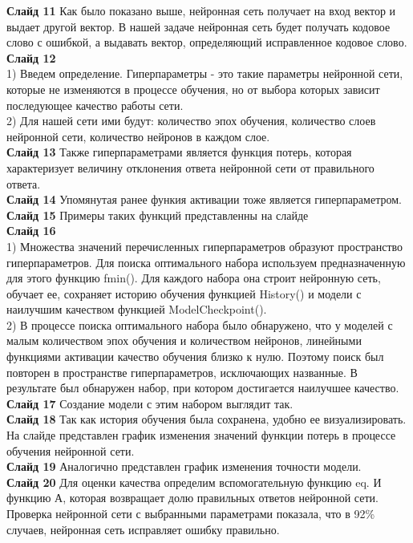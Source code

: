 \documentclass[a4paper]{article}
\begin{document}
\newpage
\textbf{Слайд 11}
Как было показано выше, нейронная сеть получает на вход вектор и выдает другой вектор. В нашей задаче нейронная сеть будет получать кодовое слово с ошибкой, а выдавать вектор, определяющий исправленное кодовое слово.\\

\textbf{Слайд 12}\\
1) Введем определение. Гиперпараметры - это такие параметры нейронной сети, которые не изменяются в процессе обучения, но от выбора которых зависит последующее качество работы сети. \\
2) Для нашей сети ими будут: количество эпох обучения, количество слоев нейронной сети, количество нейронов в каждом слое.\\

\textbf{Слайд 13}
Также гиперпараметрами является функция потерь, которая характеризует величину отклонения ответа нейронной сети от правильного ответа.\\

\textbf{Слайд 14}
Упомянутая ранее функия активации тоже является гиперпараметром.\\

\textbf{Слайд 15}
Примеры таких функций представленны на слайде\\

\textbf{Слайд 16}\\
1) Множества значений перечисленных гиперпараметров образуют пространство гиперпараметров. Для поиска оптимального набора используем предназначенную для этого функцию fmin(). Для каждого набора она строит нейронную сеть, обучает ее, сохраняет историю обучения функцией History() и модели с наилучшим качеством функцией ModelCheckpoint().\\
2) В процессе поиска оптимального набора было обнаружено, что у моделей с малым количеством эпох обучения и количеством нейронов, линейными функциями активации качество обучения близко к нулю. Поэтому поиск был повторен в пространстве гиперпараметров, исключающих названные. В результате был обнаружен набор, при котором достигается наилучшее качество.\\

\textbf{Слайд 17}
Создание модели с этим набором выглядит так.\\

\textbf{Слайд 18}
Так как история обучения была сохранена, удобно ее визуализировать. На слайде представлен график изменения значений функции потерь в процессе обучения нейронной сети.\\

\textbf{Слайд 19}
Аналогично представлен график изменения точности модели.\\

\textbf{Слайд 20}
Для оценки качества определим вспомогательную функцию eq. И функцию А, которая возвращает долю правильных ответов нейронной сети. Проверка нейронной сети с выбранными параметрами показала, что в 92\% случаев, нейронная сеть исправляет ошибку правильно.
\end{document}
